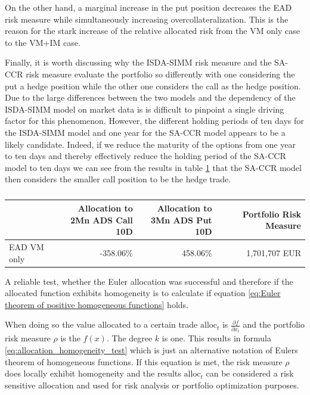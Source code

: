 \documentclass[../Thesis_AHoecherl.tex]{subfiles}
\begin{document}
    On the other hand, a marginal increase in the put position decreases the EAD risk measure while simultaneously increasing overcollateralization. This is the reason for the stark increase of the relative allocated risk from the VM only case to the VM+IM case.

    Finally, it is worth discussing why the ISDA-SIMM risk measure and the SA-CCR risk measure evaluate the portfolio so differently with one considering the put a hedge position while the other one considers the call as the hedge position.
    Due to the large differences between the two models and the dependency of the ISDA-SIMM model on market data is is difficult to pinpoint a single driving factor for this phenomenon.
    However, the different holding periods of ten days for the ISDA-SIMM model and one year for the SA-CCR model appears to be a likely candidate. Indeed, if we reduce the maturity of the options from one year to ten days and thereby effectively reduce the holding period of the SA-CCR model to ten days we can see from the results in table \ref{tab:2TradeEquity10dayEAD} that the SA-CCR model then considers the smaller call position to be the hedge trade.

    \begin{table}[htbp]
        \centering
        \begin{tabular}{l||r|r|r}
                & \makecell{Allocation to \\ 2Mn ADS Call 10D} & \makecell{Allocation to \\ 3Mn ADS Put 10D} & Portfolio Risk Measure \\
                \toprule
        EAD VM only & -358.06\% & 458.06\% & 1,701,707 EUR \\
        \end{tabular}%
        \caption{}
        \label{tab:2TradeEquity10dayEAD}%
    \end{table}%

    A reliable test, whether the Euler allocation was successful and therefore if the allocated function exhibits homogeneity is to calculate if equation \ref{eq:Euler theorem of positive homogeneous functions} holds.

    When doing so the value allocated to a certain trade $\text{alloc}_{t}$ is $\frac{\partial f}{\partial x_i}$ and the portfolio risk measure $\rho$ is the $f(x)$. The degree $k$ is one. 
    This results in formula \ref{eq:allocation_homogeneity_test} which is just an alternative notation of Eulers theorem of homogeneous functions. If this equation is met, the risk measure $\rho$ does locally exhibit homogeneity and the results $\text{alloc}_t$ can be considered a risk sensitive allocation and used for risk analysis or portfolio optimization purposes.
\end{document}
